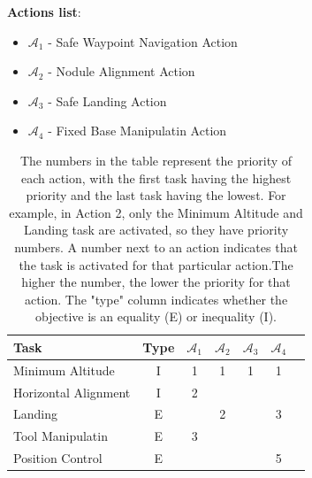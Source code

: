 \documentclass{article}
\begin{document}
\noindent
\textbf{Actions list}:
\begin{itemize}
	\item $\mathcal{A}_{1}$ - Safe Waypoint Navigation Action 
	\item $\mathcal{A}_{2}$ - Nodule Alignment Action 
	\item $\mathcal{A}_{3}$ - Safe Landing Action 
	\item $\mathcal{A}_{4}$ - Fixed Base Manipulatin Action
\end{itemize}

\begin{table}[htb]
	\label{tbl:actions_tables}
	\begin{center}
		\footnotesize
		\begin{tabular}{lcccccc}
			\toprule		
			Task & Type & $\mathcal{A}_{1}$ & $\mathcal{A}_{2}$  & $\mathcal{A}_{3}$  & $\mathcal{A}_{4}$ \\
			\midrule
			Minimum Altitude                    & I & 1 & 1 & 1 & 1  \\
			\hdashline
			Horizontal Alignment                & I & 2 &  & &  \\
			\hdashline
			Landing 						& E & & 2 & & 3 \\
			\hdashline 
			Tool Manipulatin					& E & 3 & & & \\
			\hdashline 
			Position Control 						& E & & & & 5 \\ 
			
			\bottomrule
		\end{tabular}
	\end{center}
\caption{The numbers in the table represent the priority of each action, with the first task having the highest priority and the last task having the lowest. For example, in Action 2, only the Minimum Altitude and Landing task are activated, so they have priority numbers. A number next to an action indicates that the task is activated for that particular action.The higher the number, the lower the priority for that action. The "type" column indicates whether the objective is an equality (E) or inequality (I).}
\end{table}
\end{document}
